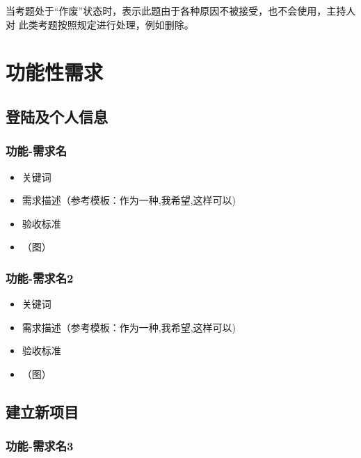 \documentclass[hyperref, a4paper]{ctexart}
\providecommand{\tightlist}{%
  \setlength{\itemsep}{0pt}\setlength{\parskip}{0pt}}
\begin{document}
当考题处于``作废''状态时，表示此题由于各种原因不被接受，也不会使用，主持人对
此类考题按照规定进行处理，例如删除。

\hypertarget{ux529fux80fdux6027ux9700ux6c42}{%
\section{功能性需求}\label{ux529fux80fdux6027ux9700ux6c42}}

\hypertarget{ux767bux9646ux53caux4e2aux4ebaux4fe1ux606f}{%
\subsection{登陆及个人信息}\label{ux767bux9646ux53caux4e2aux4ebaux4fe1ux606f}}

\hypertarget{ux529fux80fd-ux9700ux6c42ux540d}{%
\subsubsection{功能-需求名}\label{ux529fux80fd-ux9700ux6c42ux540d}}

\begin{itemize}
\tightlist
\item
  关键词
\item
  需求描述（参考模板：作为一种,我希望,这样可以)
\item
  验收标准
\item
  （图）
\end{itemize}

\hypertarget{ux529fux80fd-ux9700ux6c42ux540d2}{%
\subsubsection{功能-需求名2}\label{ux529fux80fd-ux9700ux6c42ux540d2}}

\begin{itemize}
\tightlist
\item
  关键词
\item
  需求描述（参考模板：作为一种,我希望,这样可以)
\item
  验收标准
\item
  （图）
\end{itemize}

\hypertarget{ux5efaux7acbux65b0ux9879ux76ee}{%
\subsection{建立新项目}\label{ux5efaux7acbux65b0ux9879ux76ee}}

\hypertarget{ux529fux80fd-ux9700ux6c42ux540d3}{%
\subsubsection{功能-需求名3}\label{ux529fux80fd-ux9700ux6c42ux540d3}}
\end{document}
